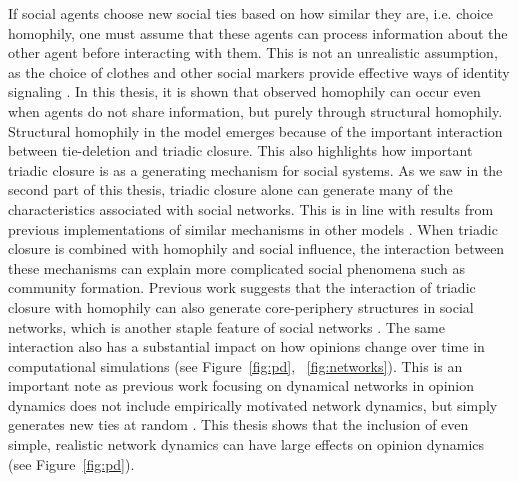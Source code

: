\documentclass[11pt]{article}
\begin{document}
If social agents choose new social ties based on how similar they are, i.e. choice homophily, one must assume that these agents can process information about the other agent before interacting with them. This is not an unrealistic assumption, as the choice of clothes and other social markers provide effective ways of identity signaling \cite{smaldino_models_2022}. In this thesis, it is shown that observed homophily can occur even when agents do not share information, but purely through structural homophily. Structural homophily in the model emerges because of the important interaction between tie-deletion and triadic closure. This also highlights how important triadic closure is as a generating mechanism for social systems. As we saw in the second part of this thesis, triadic closure alone can generate many of the characteristics associated with social networks. This is in line with results from previous implementations of similar mechanisms in other models \cite{jacksonsearch2004, jacksonmeeting2007}. When triadic closure is combined with homophily and social influence, the interaction between these mechanisms can explain more complicated social phenomena such as community formation. Previous work suggests that the interaction of triadic closure with homophily can also generate core-periphery structures in social networks, which is another staple feature of social networks \cite{asikainen_cumulative_2020}. The same interaction also has a substantial impact on how opinions change over time in computational simulations (see Figure~\ref{fig:pd}, ~\ref{fig:networks}). This is an important note as previous work focusing on dynamical networks in opinion dynamics does not include empirically motivated network dynamics, but simply generates new ties at random \cite{kozma2008consensus}. This thesis shows that the inclusion of even simple, realistic network dynamics can have large effects on opinion dynamics (see Figure~\ref{fig:pd}). 
\end{document}
